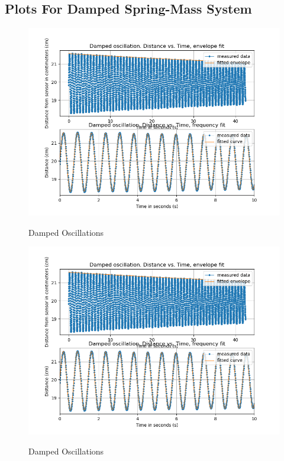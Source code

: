 \documentclass[letterpaper,12pt]{article}
\begin{document}
\subsection{Plots For Damped Spring-Mass  System}
\begin{figure}[H]
  \centering
  \includegraphics[width=0.95\linewidth]{../Fredrik/Damped oscillation. Distance vs. Time.png}    
  \begin{center}
    \emph{}
  \end{center}
  \caption{Damped Oscillations}
  \label{damped-plot}
\end{figure}

\begin{figure}[H]
  \centering
  \includegraphics[width=0.95\linewidth]{../Fredrik/Damped oscillation. Distance vs. Time.png}    
  \begin{center}
    \emph{}
  \end{center}
  \caption{Damped Oscillations}
  \label{damped-sim-plot}
\end{figure}
\end{document}
